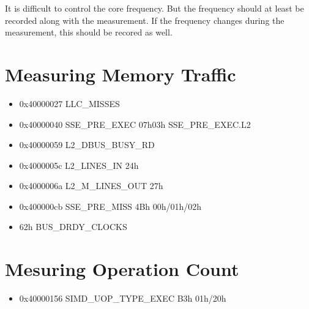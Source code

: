 \documentclass[a4paper,12pt]{article}
\begin{document}
It is difficult to control the core frequency. But the frequency should at least be recorded along with the measurement. If the frequency changes during the measurement, this should be recored as well.

\section{Measuring Memory Traffic}
\begin{itemize}
\item 0x40000027   LLC_MISSES
\item 0x40000040   SSE_PRE_EXEC 07h03h SSE_PRE_EXEC.L2
\item 0x40000059   L2_DBUS_BUSY_RD
\item 0x4000005c   L2_LINES_IN  24h
\item 0x4000006a   L2_M_LINES_OUT  27h
\item 0x400000cb   SSE_PRE_MISS 4Bh 00h/01h/02h
\item 62h BUS_DRDY_CLOCKS
\end{itemize}


\section{Mesuring Operation Count}
\begin{itemize}
\item 0x40000156   SIMD_UOP_TYPE_EXEC B3h 01h/20h
\end{itemize}





\end{document}
